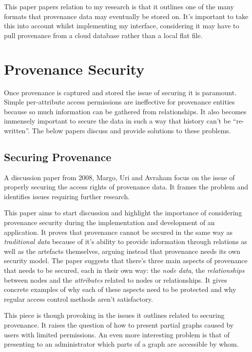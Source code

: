This paper papers relation to my research is that it outlines one of the many formats that provenance data may eventually be stored on. It's important to take this into account whilst implementing my interface, considering it may have to pull provenance from a cloud database rather than a local flat file.

\section{Provenance Security}
\label{sec:provenance_security}

Once provenance is captured and stored the issue of securing it is paramount. Simple per-attribute access permissions are ineffective for provenance entities because so much information can be gathered from relationships. It also becomes immensely important to secure the data in such a way that history can't be ``re-written''. The below papers discuss and provide solutions to these problems.

\subsection{Securing Provenance\cite{Braun2008}}
\label{sub:securing_provenancebraun2008}

A discussion paper from 2008, Margo, Uri and Avraham focus on the issue of properly securing the access rights of provenance data. It frames the problem and identifies issues requiring further research.

This paper aims to start discussion and highlight the importance of considering provenance security during the implementation and development of an application. It proves that provenance cannot be secured in the same way as \textit{traditional data} because of it's ability to provide information through relations as well as the artefacts themselves, arguing instead that provenance needs its own security model. The paper suggests that there's three main aspects of provenance that needs to be secured, each in their own way: the \textit{node data}, the \textit{relationships} between nodes and the \textit{attributes} related to nodes or relationships. It gives concrete examples of why each of these aspects need to be protected and why regular access control methods aren't satisfactory.

This piece is though provoking in the issues it outlines related to securing provenance. It raises the question of how to present partial graphs caused by users with limited permissions. An even more interesting problem is that of presenting to an administrator which parts of a graph are accessible by whom.

